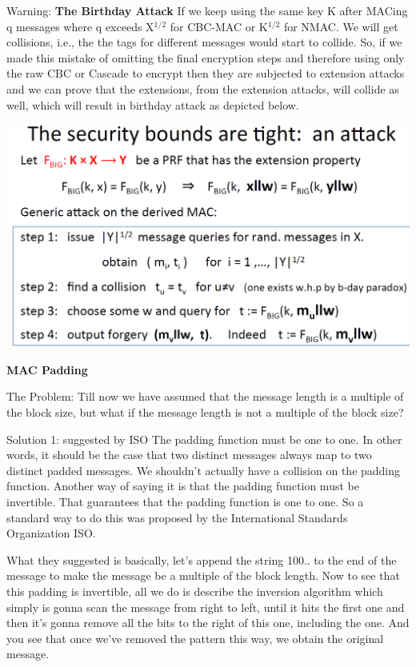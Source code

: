 \documentclass[11pt]{article}
\makeatletter
\def\maxwidth{\ifdim\Gin@nat@width>\linewidth\linewidth
    \else\Gin@nat@width\fi}
\let\Oldincludegraphics\includegraphics
\renewcommand{\includegraphics}[1]{\Oldincludegraphics[width=.8\maxwidth]{#1}}
\makeatother
\begin{document}
Warning: \textbf{The Birthday Attack} If we keep using the same key K
after MACing q messages where q exceeds \textbar{}X\textbar{}\(^{1/2}\)
for CBC-MAC or \textbar{}K\textbar{}\(^{1/2}\) for NMAC. We will get
collisions, i.e., the the tags for different messages would start to
collide. So, if we made this mistake of omitting the final encryption
steps and therefore using only the raw CBC or Cascade to encrypt then
they are subjected to extension attacks and we can prove that the
extensions, from the extension attacks, will collide as well, which will
result in birthday attack as depicted below.

\includegraphics{./Images/InsecureMACBirthdayAttack.png}

\textbf{MAC Padding}

The Problem: Till now we have assumed that the message length is a
multiple of the block size, but what if the message length is not a
multiple of the block size?

Solution 1: suggested by ISO The padding function must be one to one. In
other words, it should be the case that two distinct messages always map
to two distinct padded messages. We shouldn't actually have a collision
on the padding function. Another way of saying it is that the padding
function must be invertible. That guarantees that the padding function
is one to one. So a standard way to do this was proposed by the
International Standards Organization ISO.

What they suggested is basically, let's append the string 100.. to the
end of the message to make the message be a multiple of the block
length. Now to see that this padding is invertible, all we do is
describe the inversion algorithm which simply is gonna scan the message
from right to left, until it hits the first one and then it's gonna
remove all the bits to the right of this one, including the one. And you
see that once we've removed the pattern this way, we obtain the original
message.
\end{document}
